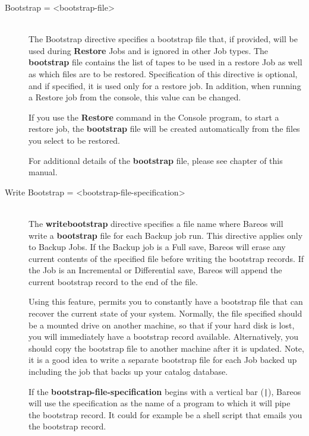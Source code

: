 \begin{description}
\item [Bootstrap = {\textless}bootstrap-file{\textgreater}] \hfill \\
The Bootstrap directive specifies a bootstrap file that, if provided,
will be used during {\bf Restore} Jobs and is ignored in other Job
types.  The {\bf bootstrap} file contains the list of tapes to be used
in a restore Job as well as which files are to be restored.
Specification of this directive is optional, and if specified, it is
used only for a restore job.  In addition, when running a Restore job
from the console, this value can be changed.

If you use the {\bf Restore} command in the Console program, to start a
restore job, the {\bf bootstrap} file will be created automatically from
the files you select to be restored.

For additional details of the {\bf bootstrap} file, please see
 chapter
of this manual.

\label{writebootstrap}
\item [Write Bootstrap =  {\textless}bootstrap-file-specification{\textgreater}] \hfill \\
The {\bf writebootstrap} directive specifies a file name where Bareos
will write a {\bf bootstrap} file for each Backup job run.  This
directive applies only to Backup Jobs.  If the Backup job is a Full
save, Bareos will erase any current contents of the specified file
before writing the bootstrap records.  If the Job is an Incremental
or Differential
save, Bareos will append the current bootstrap record to the end of the
file.

Using this feature, permits you to constantly have a bootstrap file that
can recover the current state of your system.  Normally, the file
specified should be a mounted drive on another machine, so that if your
hard disk is lost, you will immediately have a bootstrap record
available.  Alternatively, you should copy the bootstrap file to another
machine after it is updated. Note, it is a good idea to write a separate
bootstrap file for each Job backed up including the job that backs up
your catalog database.

If the {\bf bootstrap-file-specification} begins with a vertical bar
(\verb+|+), Bareos will use the specification as the name of a program to which
it will pipe the bootstrap record.  It could for example be a shell
script that emails you the bootstrap record.


\end{description}
